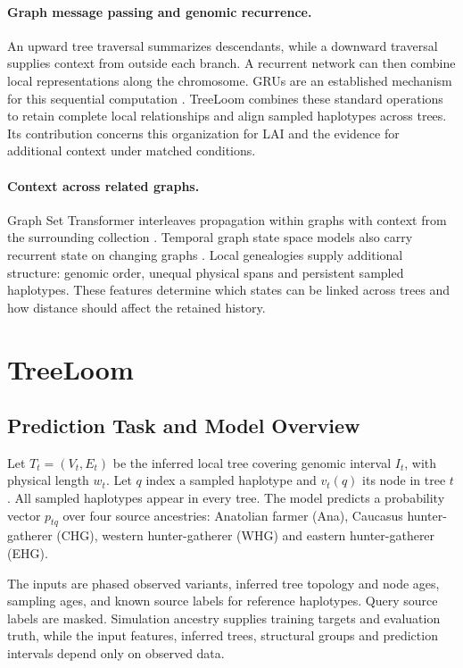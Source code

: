 \documentclass[letterpaper]{article}
\begin{document}
\paragraph{Graph message passing and genomic recurrence.}
An upward tree traversal summarizes descendants, while a downward traversal supplies context from outside each branch. A recurrent network can then combine local representations along the chromosome. GRUs are an established mechanism for this sequential computation \citep{gru2014}. TreeLoom combines these standard operations to retain complete local relationships and align sampled haplotypes across trees. Its contribution concerns this organization for LAI and the evidence for additional context under matched conditions.

\paragraph{Context across related graphs.}
Graph Set Transformer interleaves propagation within graphs with context from the surrounding collection \citep{gst2026}. Temporal graph state space models also carry recurrent state on changing graphs \citep{graphssm2024}. Local genealogies supply additional structure: genomic order, unequal physical spans and persistent sampled haplotypes. These features determine which states can be linked across trees and how distance should affect the retained history.

\section{TreeLoom}
\subsection{Prediction Task and Model Overview}
Let $T_t=(V_t,E_t)$ be the inferred local tree covering genomic interval $I_t$, with physical length $w_t$. Let $q$ index a sampled haplotype and $v_t(q)$ its node in tree $t$. All sampled haplotypes appear in every tree. The model predicts a probability vector $p_{tq}$ over four source ancestries: Anatolian farmer (Ana), Caucasus hunter-gatherer (CHG), western hunter-gatherer (WHG) and eastern hunter-gatherer (EHG).

The inputs are phased observed variants, inferred tree topology and node ages, sampling ages, and known source labels for reference haplotypes. Query source labels are masked. Simulation ancestry supplies training targets and evaluation truth, while the input features, inferred trees, structural groups and prediction intervals depend only on observed data.
\end{document}
